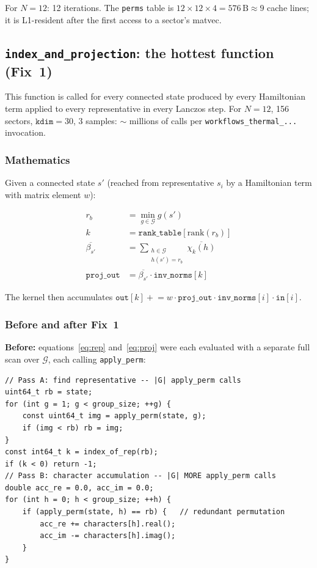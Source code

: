 \documentclass[11pt,a4paper]{article}
\newcommand{\rb}{r_b}
\begin{document}
For $N=12$: 12 iterations.  The \texttt{perms} table is
$12 \times 12 \times 4 = 576\,\mathrm{B} \approx 9$ cache lines; it is L1-resident
after the first access to a sector's matvec.

\subsection{\texttt{index\_and\_projection}: the hottest function (Fix~1)}
\label{sec:iap_cpu}

This function is called for every connected state produced by every
Hamiltonian term applied to every representative in every Lanczos step.
For $N=12$, 156 sectors, $\texttt{kdim}=30$, 3 samples: $\sim$ millions of
calls per \texttt{workflows\_thermal\_...} invocation.

\subsubsection{Mathematics}

Given a connected state $s'$ (reached from representative $s_i$ by a
Hamiltonian term with matrix element $w$):

\begin{align}
  \rb &= \min_{g \in \mathcal{G}} g(s') \label{eq:rep} \\
  k &= \texttt{rank\_table}[\mathrm{rank}(\rb)] \label{eq:orbit_idx} \\
  \overline{\beta_{s'}} &= \sum_{\substack{h \in \mathcal{G} \\ h(s') = \rb}}
    \overline{\chi_k(h)} \label{eq:proj} \\
  \texttt{proj\_out} &= \overline{\beta_{s'}} \cdot \texttt{inv\_norms}[k]
  \label{eq:proj_out}
\end{align}

The kernel then accumulates
$\texttt{out}[k] \mathrel{+}= w \cdot \texttt{proj\_out} \cdot
\texttt{inv\_norms}[i] \cdot \texttt{in}[i]$.

\subsubsection{Before and after Fix~1}

\textbf{Before:} equations~\eqref{eq:rep} and~\eqref{eq:proj} were each
evaluated with a separate full scan over $\mathcal{G}$, each calling
\texttt{apply\_perm}:

\begin{lstlisting}[caption={Original two-pass approach (before Fix 1)}]
// Pass A: find representative -- |G| apply_perm calls
uint64_t rb = state;
for (int g = 1; g < group_size; ++g) {
    const uint64_t img = apply_perm(state, g);
    if (img < rb) rb = img;
}
const int64_t k = index_of_rep(rb);
if (k < 0) return -1;
// Pass B: character accumulation -- |G| MORE apply_perm calls
double acc_re = 0.0, acc_im = 0.0;
for (int h = 0; h < group_size; ++h) {
    if (apply_perm(state, h) == rb) {   // redundant permutation
        acc_re += characters[h].real();
        acc_im -= characters[h].imag();
    }
}
\end{lstlisting}
\end{document}
